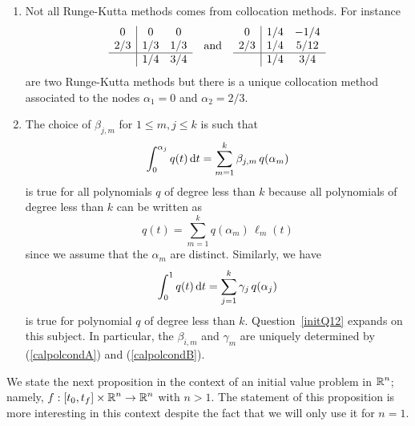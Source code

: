 \begin{rmkList}\label{RKcolInterpol}
\begin{enumerate}
\item Not all Runge-Kutta methods comes from collocation methods.  For
instance
\[
\begin{array}{c|cc}
0 & 0 & 0 \\
2/3 & 1/3 & 1/3 \\
\hline
 & 1/4 & 3/4
\end{array}
\quad\text{and} \quad
\begin{array}{c|cc}
0 & 1/4 & -1/4 \\
2/3 & 1/4 & 5/12 \\
\hline
 & 1/4 & 3/4
\end{array}
\]
are two Runge-Kutta methods but there is a unique collocation method
associated to the nodes $\alpha_1 =0$ and $\alpha_2 = 2/3$.
\item The choice of $\beta_{j,m}$ for $1 \leq m,j\leq k$ is such that
\begin{equation}\label{calpolcondA}
\int_0^{\alpha_j} q(t) \,\mathrm{d}t = \sum_{m=1}^k \beta_{j,m}\, q(\alpha_m)
\end{equation}
is true for all polynomials $q$ of degree less than $k$ because all
polynomials of degree less than $k$ can be written as
\[
  q(t) = \sum_{m=1}^k q(\alpha_m)\, \ell_m(t)
\]
since we assume that the $\alpha_m$ are distinct.  Similarly, we have
\begin{equation}\label{calpolcondB}
\int_0^1 q(t) \,\mathrm{d}t = \sum_{j=1}^k \gamma_j\, q(\alpha_j)
\end{equation}
is true for polynomial $q$ of degree less than $k$.
Question~\ref{initQ12} expands on this subject.  In particular, the
$\beta_{i,m}$ and $\gamma_m$ are uniquely determined by
(\ref{calpolcondA}) and (\ref{calpolcondB}).
\end{enumerate}
\end{rmkList}

We state the next proposition in the context of an initial value
problem in $\displaystyle \mathbb{R}^n$; namely,
$\displaystyle f:[t_0,t_f]\times \mathbb{R}^n \to \mathbb{R}^n$ with
$n>1$.  The statement of this proposition is more interesting in this
context despite the fact that we will only use it for $n=1$. 

